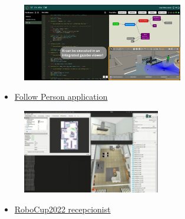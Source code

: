 \documentclass[notes,slidesec,a4]{seminar}
\begin{document}
\begin{hslide}
\newpage
{}
\hspace{-1.cm}
\begin{minipage}[t]{7cm}
  \begin{figure}
    \includegraphics[width=7cm]{figs/demo-followperson.png}
  \end{figure}
  \begin{itemize}
           \item \href{https://youtu.be/a4c-nRevF_c}{Follow Person application}
  \end{itemize}
\end{minipage}
  \begin{minipage}[t]{6cm}
  \begin{figure}
    \includegraphics[width=6cm]{figs/demo-robocup2022.png}    
  \end{figure}
  \begin{itemize}
  \item \href{https://youtu.be/yZZWjFbdt_4}{RoboCup2022 recepcionist}        
  \end{itemize}
\end{minipage}
\end{hslide}
\end{document}
